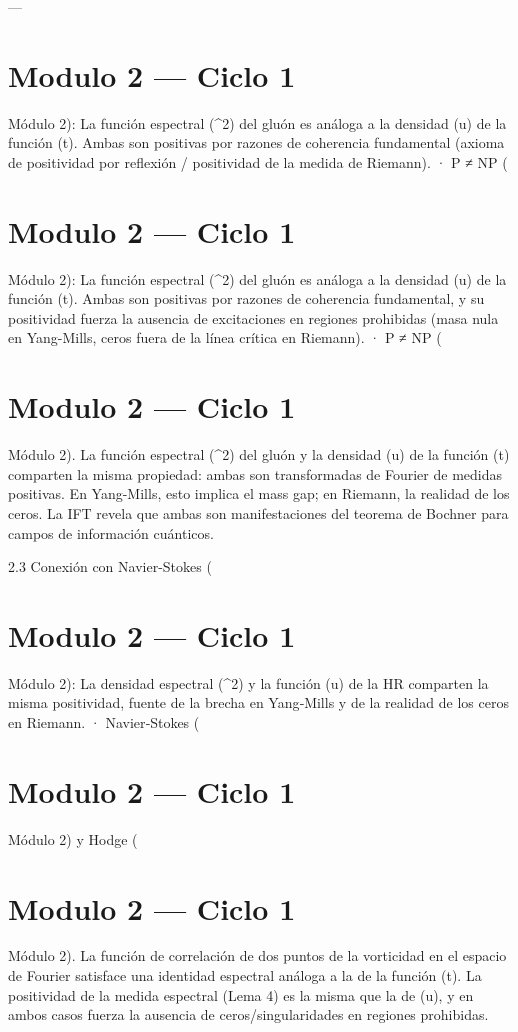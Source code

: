 \documentclass[12pt,twoside]{book}
\begin{document}
---




\chapter{Modulo 2 — Ciclo 1}
Módulo 2): La función espectral \rho(\mu^2) del gluón es análoga a la densidad \Phi(u) de la función \Xi(t). Ambas son positivas por razones de coherencia fundamental (axioma de positividad por reflexión / positividad de la medida de Riemann).
· P ≠ NP (

\chapter{Modulo 2 — Ciclo 1}
Módulo 2): La función espectral \rho(\mu^2) del gluón es análoga a la densidad \Phi(u) de la función \Xi(t). Ambas son positivas por razones de coherencia fundamental, y su positividad fuerza la ausencia de excitaciones en regiones prohibidas (masa nula en Yang-Mills, ceros fuera de la línea crítica en Riemann).
· P ≠ NP (

\chapter{Modulo 2 — Ciclo 1}
Módulo 2).
La función espectral \rho(\mu^2) del gluón y la densidad \Phi(u) de la función \Xi(t) comparten la misma propiedad: ambas son transformadas de Fourier de medidas positivas. En Yang-Mills, esto implica el mass gap; en Riemann, la realidad de los ceros. La IFT revela que ambas son manifestaciones del teorema de Bochner para campos de información cuánticos.

2.3 Conexión con Navier-Stokes (

\chapter{Modulo 2 — Ciclo 1}
Módulo 2): La densidad espectral \rho(\mu^2) y la función \Phi(u) de la HR comparten la misma positividad, fuente de la brecha en Yang‑Mills y de la realidad de los ceros en Riemann.
· Navier‑Stokes (

\chapter{Modulo 2 — Ciclo 1}
Módulo 2) y Hodge (

\chapter{Modulo 2 — Ciclo 1}
Módulo 2).
La función de correlación de dos puntos de la vorticidad en el espacio de Fourier satisface una identidad espectral análoga a la de la función \Xi(t). La positividad de la medida espectral (Lema 4) es la misma que la de \Phi(u), y en ambos casos fuerza la ausencia de ceros/singularidades en regiones prohibidas.
\end{document}

